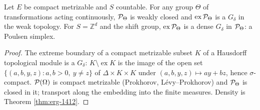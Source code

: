 \begin{theorem}[Georgii (14.13)]
    \label{thm:erg-1413}
    \leanok

    Let $E$ be compact metrizable and $S$ countable. For any group $\Theta$ of transformations
    acting continuously, $\mathcal{P}_\Theta$ is weakly closed and $\operatorname{ex}\mathcal{P}_\Theta$
    is a $G_\delta$ in the weak topology. For $S = \mathbb Z^d$ and the shift group,
    $\operatorname{ex}\mathcal{P}_\Theta$ is a dense $G_\delta$ in $\mathcal{P}_\Theta$: a Poulsen simplex.
\end{theorem}
\begin{proof}
    \leanok
    The extreme boundary of a compact metrizable subset $K$ of a Hausdorff topological module
    is a $G_\delta$: $K \setminus \operatorname{ex} K$ is the image of the open set
    $\{(a,b,y,z) : a, b > 0,\ y \neq z\}$ of $\Delta \times K \times K$ under
    $(a,b,y,z) \mapsto ay + bz$, hence $\sigma$-compact. $\mathcal{P}(\Omega)$ is compact metrizable
    (Prokhorov, Lévy--Prokhorov) and $\mathcal{P}_\Theta$ is closed in it; transport along the
    embedding into the finite measures. Density is Theorem \ref{thm:erg-1412}.
\end{proof}

